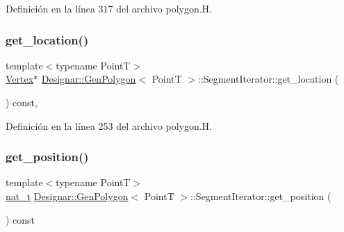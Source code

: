 Definición en la línea 317 del archivo polygon.\+H.

\mbox{\label{class_designar_1_1_gen_polygon_1_1_segment_iterator_aa9bf75b7e9feef819ad97f7acd152fe6}} 
\subsubsection{\texorpdfstring{get\+\_\+location()}{get\_location()}}
{\footnotesize\ttfamily template$<$typename PointT$>$ \\
\hyperlink{class_designar_1_1_d_l_node}{Vertex}$\ast$ \hyperlink{class_designar_1_1_gen_polygon}{Designar\+::\+Gen\+Polygon}$<$ PointT $>$\+::Segment\+Iterator\+::get\+\_\+location (\begin{DoxyParamCaption}{ }\end{DoxyParamCaption}) const\hspace{0.3cm}{\ttfamily [inline]}, {\ttfamily [protected]}}



Definición en la línea 253 del archivo polygon.\+H.

\mbox{\label{class_designar_1_1_gen_polygon_1_1_segment_iterator_abb850f5034a93dd4da93de11c5619de5}} 
\subsubsection{\texorpdfstring{get\+\_\+position()}{get\_position()}}
{\footnotesize\ttfamily template$<$typename PointT$>$ \\
\hyperlink{namespace_designar_aa72662848b9f4815e7bf31a7cf3e33d1}{nat\+\_\+t} \hyperlink{class_designar_1_1_gen_polygon}{Designar\+::\+Gen\+Polygon}$<$ PointT $>$\+::Segment\+Iterator\+::get\+\_\+position (\begin{DoxyParamCaption}{ }\end{DoxyParamCaption}) const\hspace{0.3cm}{\ttfamily [inline]}}



